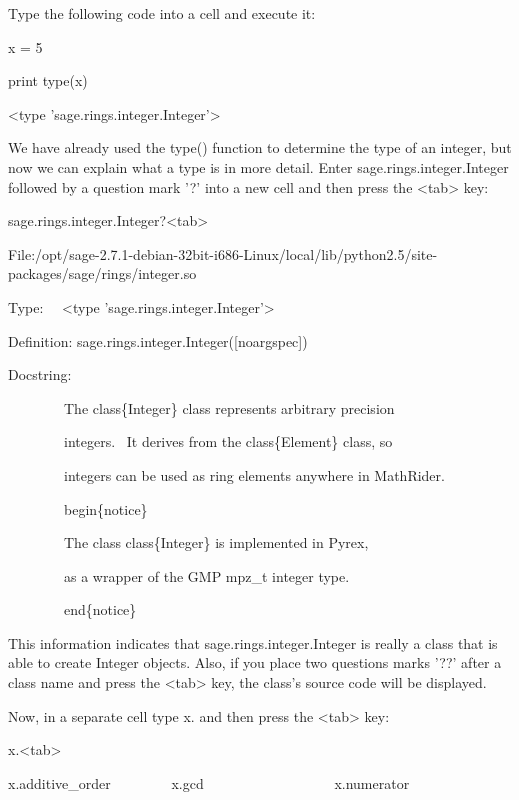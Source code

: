 \documentclass[12pt,oneside]{book}
\begin{document}
Type the following code into a cell and execute it:


x = 5

print type(x)

{\textbar}

{\textless}type 'sage.rings.integer.Integer'{\textgreater}


We have already used the type() function to determine the type of an integer, but now we can explain what a type is in more detail. Enter sage.rings.integer.Integer followed by a question mark '?' into a new cell and then press the {\textless}tab{\textgreater} key: 

sage.rings.integer.Integer?{\textless}tab{\textgreater}

{\textbar}

File:/opt/sage{}-2.7.1{}-debian{}-32bit{}-i686{}-Linux/local/lib/python2.5/site{}-packages/sage/rings/integer.so


Type: \ \ {\textless}type
'sage.rings.integer.Integer'{\textgreater}


Definition: sage.rings.integer.Integer([noargspec]) 


Docstring: 


\ \ \ \ \ \ \ \ The class\{Integer\} class represents arbitrary precision 

\ \ \ \ \ \ \ \ integers. \ It derives from the class\{Element\} class, so 

\ \ \ \ \ \ \ \ integers can be used as ring elements anywhere in MathRider. 


\ \ \ \ \ \ \ \ begin\{notice\} 

\ \ \ \ \ \ \ \ The class class\{Integer\} is implemented in Pyrex, 

\ \ \ \ \ \ \ \ as a wrapper of the GMP mpz\_t integer type. 

\ \ \ \ \ \ \ \ end\{notice\} 


This information indicates that sage.rings.integer.Integer is really a class that is able to create Integer objects. Also, if you place two questions marks '??' after a class name and press the {\textless}tab{\textgreater} key, the class's source code will be displayed. 

Now, in a separate cell type x. and then press the {\textless}tab{\textgreater} key: 

x.{\textless}tab{\textgreater}

{\textbar}

x.additive\_order \ \ \ \ \ \ \ \ x.gcd
\ \ \ \ \ \ \ \ \ \ \ \ \ \ \ \ \ \ x.numerator
\end{document}
